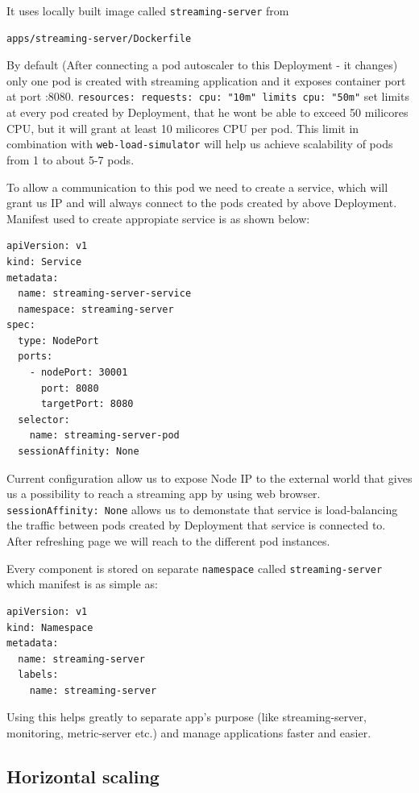 \documentclass{article}
\begin{document}
It uses locally built image called \texttt{streaming-server} from

\begin{verbatim}
apps/streaming-server/Dockerfile
\end{verbatim}

By default (After connecting a pod autoscaler to this Deployment - it
changes) only one pod is created with streaming application and it
exposes container port at port :8080.
\newline\texttt{resources: requests: cpu: "10m" limits cpu: "50m"}
set limits at every pod created by Deployment, that he wont be able to
exceed 50 milicores CPU, but it will grant at least 10 milicores CPU per
pod. This limit in combination with \texttt{web-load-simulator} will
help us achieve scalability of pods from 1 to about 5-7 pods.

To allow a communication to this pod we need to create a service, which
will grant us IP and will always connect to the pods created by above
Deployment. Manifest used to create appropiate service is as shown
below:
\begin{verbatim}
apiVersion: v1
kind: Service
metadata:
  name: streaming-server-service
  namespace: streaming-server
spec:
  type: NodePort
  ports:
    - nodePort: 30001
      port: 8080
      targetPort: 8080
  selector:
    name: streaming-server-pod
  sessionAffinity: None
\end{verbatim}
Current configuration allow us to expose Node IP to the external world
that gives us a possibility to reach a streaming app by using web
browser. \texttt{sessionAffinity:\ None} allows us to demonstate that
service is load-balancing the traffic between pods created by Deployment
that service is connected to. After refreshing page we will reach to the
different pod instances.

Every component is stored on separate \texttt{namespace} called
\texttt{streaming-server} which manifest is as simple as:

\begin{verbatim}
apiVersion: v1
kind: Namespace
metadata:
  name: streaming-server
  labels:
    name: streaming-server
\end{verbatim}

Using this helps greatly to separate app's purpose (like
streaming-server, monitoring, metric-server etc.) and manage
applications faster and easier.

\subsection{Horizontal scaling}\label{horizontal-scaling}
\end{document}
